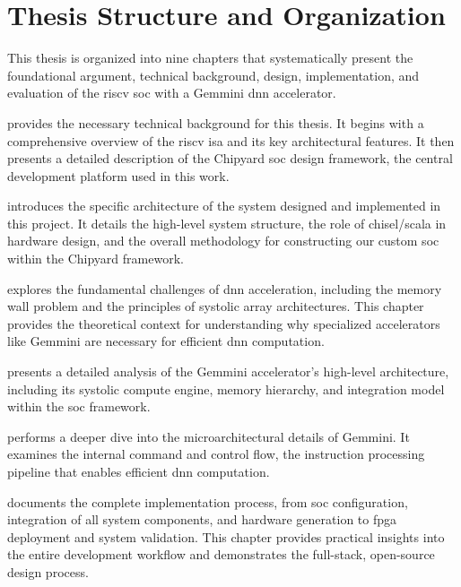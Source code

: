 \section{Thesis Structure and Organization}

This thesis is organized into nine chapters that systematically present the foundational argument, technical background, design, implementation, and evaluation of the \acrshort{riscv} \acrshort{soc} with a Gemmini \acrshort{dnn} accelerator.

\textbf{} provides the necessary technical background for this thesis. It begins with a comprehensive overview of the \acrshort{riscv} \acrshort{isa} and its key architectural features. It then presents a detailed description of the Chipyard \acrshort{soc} design framework, the central development platform used in this work.

\textbf{} introduces the specific architecture of the system designed and implemented in this project. It details the high-level system structure, the role of \acrshort{chisel}/\acrshort{scala} in hardware design, and the overall methodology for constructing our custom \acrshort{soc} within the Chipyard framework.

\textbf{} explores the fundamental challenges of \acrlong{dnn} acceleration, including the memory wall problem and the principles of systolic array architectures. This chapter provides the theoretical context for understanding why specialized accelerators like Gemmini are necessary for efficient \acrshort{dnn} computation.

\textbf{} presents a detailed analysis of the Gemmini accelerator's high-level architecture, including its systolic compute engine, memory hierarchy, and integration model within the \acrshort{soc} framework.

\textbf{} performs a deeper dive into the microarchitectural details of Gemmini. It examines the internal command and control flow, the instruction processing pipeline that enables efficient \acrshort{dnn} computation.

\textbf{} documents the complete implementation process, from \acrshort{soc} configuration, integration of all system components, and hardware generation to \acrshort{fpga} deployment and system validation. This chapter provides practical insights into the entire development workflow and demonstrates the full-stack, open-source design process.

